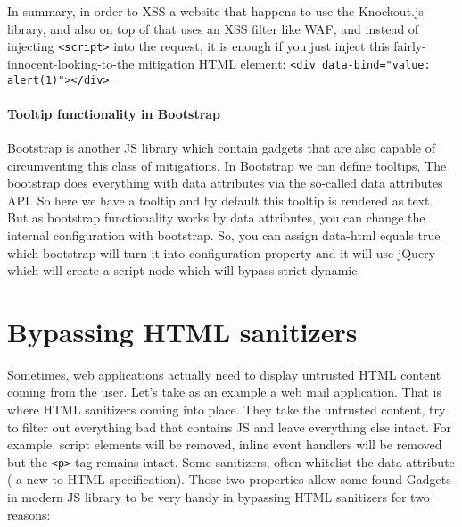 




In summary, in order to XSS a website that happens to use the Knockout.js library, and also on top of that uses an XSS filter like WAF, and instead of injecting \verb|<script>| into the request, it is enough if you just inject this fairly-innocent-looking-to-the mitigation HTML element: 
\verb|<div data-bind="value: alert(1)"></div>|

\paragraph{Tooltip functionality in Bootstrap}
Bootstrap is another JS library which contain gadgets that are also capable of circumventing this class of mitigations. In Bootstrap we can define tooltips, The bootstrap does everything with data attributes via the so-called data attributes API. So here we have a tooltip and by default this tooltip is rendered as text. But as bootstrap functionality works by data attributes, you can change the internal configuration with bootstrap. So, you can assign data-html equals true which bootstrap will turn it into configuration property and it will use jQuery which will create a script node which will bypass strict-dynamic. 




\section{Bypassing HTML sanitizers}

Sometimes, web applications actually need to display untrusted HTML content coming from the user. Let’s take as an example a web mail application. That is where HTML sanitizers coming into place. They take the untrusted content, try to filter out everything bad that contains JS and leave everything else intact. For example, script elements will be removed, inline event handlers will be removed but the \verb|<p>| tag remains intact. Some sanitizers, often whitelist the data attribute ( a new to HTML specification). Those two properties allow some found Gadgets in modern JS library to be very handy in bypassing HTML sanitizers for two reasons:

